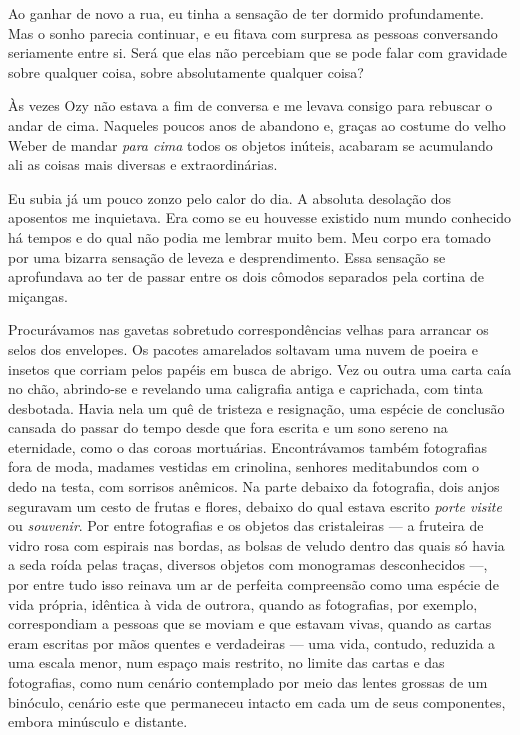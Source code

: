 Ao ganhar de novo a rua, eu tinha a sensação de ter dormido profundamente. Mas
o sonho parecia continuar, e eu fitava com surpresa as pessoas conversando
seriamente entre si. Será que elas não percebiam que se pode falar com
gravidade sobre qualquer coisa, sobre absolutamente qualquer coisa?

Às vezes Ozy não estava a fim de conversa e me levava consigo para rebuscar o
andar de cima. Naqueles poucos anos de abandono e, graças ao costume do velho
Weber de mandar \textit{para cima} todos os objetos inúteis, acabaram se
acumulando ali as coisas mais diversas e extraordinárias.


Eu subia já um pouco zonzo pelo calor do dia. A absoluta desolação dos
aposentos me inquietava. Era como se eu houvesse existido num mundo conhecido
há tempos e do qual não podia me lembrar muito bem. Meu corpo era tomado por
uma bizarra sensação de leveza e desprendimento. Essa sensação se aprofundava
ao ter de passar entre os dois cômodos separados pela cortina de miçangas.

Procurávamos nas gavetas sobretudo correspondências velhas para arrancar os
selos dos envelopes. Os pacotes amarelados soltavam uma nuvem de poeira e
insetos que corriam pelos papéis em busca de abrigo. Vez ou outra uma carta
caía no chão, abrindo-se e revelando uma caligrafia antiga e caprichada, com
tinta desbotada. Havia nela um quê de tristeza e resignação, uma espécie de
conclusão cansada do passar do tempo desde que fora escrita e um sono sereno
na eternidade, como o das coroas mortuárias. Encontrávamos também fotografias
fora de moda, madames vestidas em crinolina, senhores meditabundos com o dedo
na testa, com sorrisos anêmicos. Na parte debaixo da fotografia, dois anjos
seguravam um cesto de frutas e flores, debaixo do qual estava escrito \emph
{porte visite} ou \emph{souvenir}. Por entre fotografias e os objetos das
cristaleiras --- a fruteira de vidro rosa com espirais nas bordas, as bolsas
de veludo dentro das quais só havia a seda roída pelas traças, diversos
objetos com monogramas desconhecidos ---, por entre tudo isso reinava um ar
de perfeita compreensão como uma espécie de vida própria, idêntica à vida de
outrora, quando as fotografias, por exemplo, correspondiam a pessoas que se
moviam e que estavam vivas, quando as cartas eram escritas por mãos quentes e
verdadeiras --- uma vida, contudo, reduzida a uma escala menor, num espaço
mais restrito, no limite das cartas e das fotografias, como num cenário
contemplado por meio das lentes grossas de um binóculo, cenário este que
permaneceu intacto em cada um de seus componentes, embora minúsculo e
distante.

